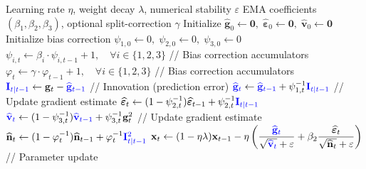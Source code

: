 \begin{algorithm}
\caption{IRIS: Innovation Residual Iterative Stabilization}
\begin{algorithmic}
\REQUIRE Learning rate $\eta$, weight decay $\lambda$, numerical stability $\varepsilon$
\REQUIRE EMA coefficients $(\beta_1, \beta_2, \beta_3)$, optional split-correction $\gamma$
\STATE Initialize $\widehat{\mathbf{g}}_0 \gets \mathbf{0}, \; \widehat{\bm{\varepsilon}}_0 \gets \mathbf{0}, \; \widehat{\mathbf{v}}_0 \gets \mathbf{0}$
\STATE Initialize bias correction $\psi_{1,0} \gets 0, \; \psi_{2,0} \gets 0, \; \psi_{3,0} \gets 0$
    \STATE $\psi_{i,t} \gets \beta_i \cdot \psi_{i,t-1} + 1, \quad \forall i \in \{1,2,3\}$ \hfill // Bias correction accumulators
    \STATE $\varphi_{t} \gets \gamma \cdot \varphi_{t-1} + 1, \quad \forall i \in \{1,2,3\}$ \hfill // Bias correction accumulators
    \STATE $\textcolor{blue}{\mathbf{I}_{t|t-1}} \gets \mathbf{g}_t - \textcolor{blue}{\widehat{\mathbf{g}}_{t-1}}$ \hfill // Innovation (prediction error)
    \STATE $\textcolor{blue}{\widehat{\mathbf{g}}_t} \gets \textcolor{blue}{\widehat{\mathbf{g}}_{t-1}} + \psi_{1,t}^{-1} \textcolor{blue}{\mathbf{I}_{t|t-1}}$ \hfill // Update gradient estimate
    \STATE $\widehat{\bm{\varepsilon}}_t\gets(1-\psi_{2,t}^{-1})\widehat{\bm{\varepsilon}}_{t-1}+\psi_{2,t}^{-1} \textcolor{blue}{\mathbf{I}_{t|t-1}}$
    \STATE $\textcolor{blue}{\widehat{\mathbf{v}}_t} \gets (1-\psi_{3,t}^{-1})\textcolor{blue}{\widehat{\mathbf{v}}_{t-1}} + \psi_{3,t}^{-1} {\mathbf{g}_{t}^2}$ \hfill // Update gradient estimate
    \STATE $\widehat{\mathbf{n}}_t\gets(1-\varphi_{t}^{-1})\widehat{\mathbf{n}}_{t-1}+\varphi_{t}^{-1} \textcolor{blue}{\mathbf{I}_{t|t-1}^2}$
    \STATE $\mathbf{x}_t \gets (1 - \eta\lambda) \mathbf{x}_{t-1} - \eta \left(\dfrac{\textcolor{blue}{\widehat{\mathbf{g}}_t} }{\sqrt{\textcolor{blue}{\widehat{\mathbf{v}}_t}} + \varepsilon}+\beta_2\dfrac{{\widehat{\bm{\varepsilon}}_t}}{\sqrt{\widehat{\mathbf{n}}_t} + \varepsilon}\right)$ \hfill // Parameter update
    

\end{algorithmic}
\end{algorithm}
